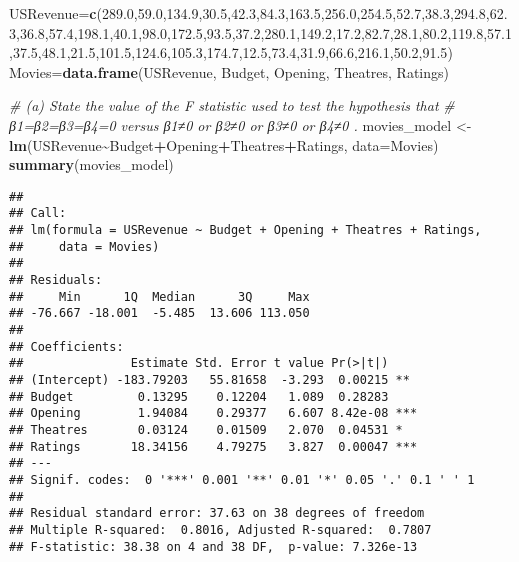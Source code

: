 \documentclass[
]{article}
\newenvironment{Shaded}{\begin{snugshade}}{\end{snugshade}}
\newcommand{\AttributeTok}[1]{\textcolor[rgb]{0.13,0.29,0.53}{#1}}
\newcommand{\CommentTok}[1]{\textcolor[rgb]{0.56,0.35,0.01}{\textit{#1}}}
\newcommand{\FloatTok}[1]{\textcolor[rgb]{0.00,0.00,0.81}{#1}}
\newcommand{\FunctionTok}[1]{\textcolor[rgb]{0.13,0.29,0.53}{\textbf{#1}}}
\newcommand{\NormalTok}[1]{#1}
\newcommand{\OtherTok}[1]{\textcolor[rgb]{0.56,0.35,0.01}{#1}}
\newcommand{\SpecialCharTok}[1]{\textcolor[rgb]{0.81,0.36,0.00}{\textbf{#1}}}
\begin{document}
\begin{Shaded}
\begin{Highlighting}[]
\NormalTok{USRevenue}\OtherTok{=}\FunctionTok{c}\NormalTok{(}\FloatTok{289.0}\NormalTok{,}\FloatTok{59.0}\NormalTok{,}\FloatTok{134.9}\NormalTok{,}\FloatTok{30.5}\NormalTok{,}\FloatTok{42.3}\NormalTok{,}\FloatTok{84.3}\NormalTok{,}\FloatTok{163.5}\NormalTok{,}\FloatTok{256.0}\NormalTok{,}\FloatTok{254.5}\NormalTok{,}\FloatTok{52.7}\NormalTok{,}\FloatTok{38.3}\NormalTok{,}\FloatTok{294.8}\NormalTok{,}\FloatTok{62.3}\NormalTok{,}\FloatTok{36.8}\NormalTok{,}\FloatTok{57.4}\NormalTok{,}\FloatTok{198.1}\NormalTok{,}\FloatTok{40.1}\NormalTok{,}\FloatTok{98.0}\NormalTok{,}\FloatTok{172.5}\NormalTok{,}\FloatTok{93.5}\NormalTok{,}\FloatTok{37.2}\NormalTok{,}\FloatTok{280.1}\NormalTok{,}\FloatTok{149.2}\NormalTok{,}\FloatTok{17.2}\NormalTok{,}\FloatTok{82.7}\NormalTok{,}\FloatTok{28.1}\NormalTok{,}\FloatTok{80.2}\NormalTok{,}\FloatTok{119.8}\NormalTok{,}\FloatTok{57.1}\NormalTok{,}\FloatTok{37.5}\NormalTok{,}\FloatTok{48.1}\NormalTok{,}\FloatTok{21.5}\NormalTok{,}\FloatTok{101.5}\NormalTok{,}\FloatTok{124.6}\NormalTok{,}\FloatTok{105.3}\NormalTok{,}\FloatTok{174.7}\NormalTok{,}\FloatTok{12.5}\NormalTok{,}\FloatTok{73.4}\NormalTok{,}\FloatTok{31.9}\NormalTok{,}\FloatTok{66.6}\NormalTok{,}\FloatTok{216.1}\NormalTok{,}\FloatTok{50.2}\NormalTok{,}\FloatTok{91.5}\NormalTok{)}
\NormalTok{Movies}\OtherTok{=}\FunctionTok{data.frame}\NormalTok{(USRevenue, Budget, Opening, Theatres, Ratings)}

\CommentTok{\# (a) State the value of the  F  statistic used to test the hypothesis that }
\CommentTok{\# β1=β2=β3=β4=0  versus  β1≠0  or  β2≠0  or β3≠0  or  β4≠0 .}
\NormalTok{movies\_model }\OtherTok{\textless{}{-}} \FunctionTok{lm}\NormalTok{(USRevenue}\SpecialCharTok{\textasciitilde{}}\NormalTok{Budget}\SpecialCharTok{+}\NormalTok{Opening}\SpecialCharTok{+}\NormalTok{Theatres}\SpecialCharTok{+}\NormalTok{Ratings, }\AttributeTok{data=}\NormalTok{Movies)}
\FunctionTok{summary}\NormalTok{(movies\_model)}
\end{Highlighting}
\end{Shaded}

\begin{verbatim}
## 
## Call:
## lm(formula = USRevenue ~ Budget + Opening + Theatres + Ratings, 
##     data = Movies)
## 
## Residuals:
##     Min      1Q  Median      3Q     Max 
## -76.667 -18.001  -5.485  13.606 113.050 
## 
## Coefficients:
##               Estimate Std. Error t value Pr(>|t|)    
## (Intercept) -183.79203   55.81658  -3.293  0.00215 ** 
## Budget         0.13295    0.12204   1.089  0.28283    
## Opening        1.94084    0.29377   6.607 8.42e-08 ***
## Theatres       0.03124    0.01509   2.070  0.04531 *  
## Ratings       18.34156    4.79275   3.827  0.00047 ***
## ---
## Signif. codes:  0 '***' 0.001 '**' 0.01 '*' 0.05 '.' 0.1 ' ' 1
## 
## Residual standard error: 37.63 on 38 degrees of freedom
## Multiple R-squared:  0.8016, Adjusted R-squared:  0.7807 
## F-statistic: 38.38 on 4 and 38 DF,  p-value: 7.326e-13
\end{verbatim}
\end{document}
